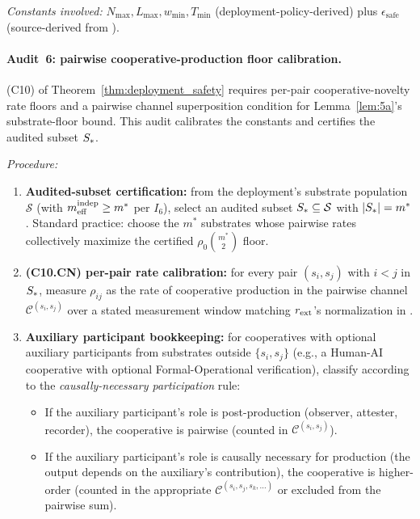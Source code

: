\emph{Constants involved:} $N_{\max}, L_{\max}, w_{\min}, T_{\min}$
(deployment-policy-derived) plus $\epsilon_{\mathrm{safe}}$
(source-derived from \citep[Phase~Redundancy]{lasser2026phase}).

\paragraph{Audit~6: pairwise cooperative-production floor calibration.}

(C10) of Theorem~\ref{thm:deployment_safety} requires per-pair
cooperative-novelty rate floors and a pairwise channel
superposition condition for Lemma~\ref{lem:5a}'s substrate-floor
bound.  This audit calibrates the constants and certifies the
audited subset $S_*$.

\emph{Procedure:}
\begin{enumerate}
\item \textbf{Audited-subset certification:} from the deployment's
  substrate population $\mathcal{S}$ (with $m_{\mathrm{eff}}^{\mathrm{indep}} \geq m^*$
  per $I_6$), select an audited subset $S_* \subseteq
  \mathcal{S}$ with $|S_*| = m^*$.  Standard practice: choose
  the $m^*$ substrates whose pairwise rates collectively maximize
  the certified $\rho_0 \binom{m^*}{2}$ floor.
\item \textbf{(C10.CN) per-pair rate calibration:} for every pair
  $(s_i, s_j)$ with $i < j$ in $S_*$, measure
  $\rho_{ij}$ as the rate of cooperative production in the
  pairwise channel $\mathcal{C}^{(s_i, s_j)}$ over a stated
  measurement window matching $r_{\mathrm{ext}}$'s normalization in
  \citep[Horizon~Aware]{lasser2026horizon}.
\item \textbf{Auxiliary participant bookkeeping:} for cooperatives
  with optional auxiliary participants from substrates outside
  $\{s_i, s_j\}$ (e.g., a Human-AI cooperative with optional
  Formal-Operational verification), classify according to the
  \emph{causally-necessary participation} rule:
  \begin{itemize}
  \item If the auxiliary participant's role is post-production
    (observer, attester, recorder), the cooperative is pairwise
    (counted in $\mathcal{C}^{(s_i, s_j)}$).
  \item If the auxiliary participant's role is causally necessary
    for production (the output depends on the auxiliary's
    contribution), the cooperative is higher-order (counted in
    the appropriate $\mathcal{C}^{(s_i, s_j, s_k, \ldots)}$ or
    excluded from the pairwise sum).

\end{itemize}
\end{enumerate}
